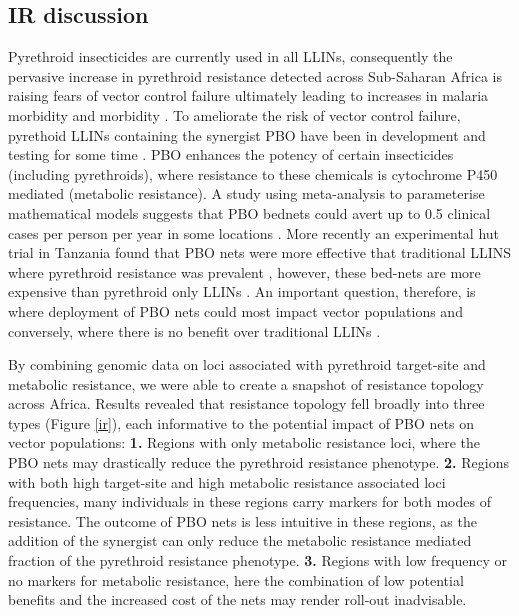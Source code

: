 \documentclass[a4paper,11pt,abstracton,hidelinks]{scrartcl}
\begin{document}
\subsection*{IR discussion}

Pyrethroid insecticides are currently used in all LLINs, consequently the pervasive increase in pyrethroid resistance detected across Sub-Saharan Africa is raising fears of vector control failure ultimately leading to increases in malaria morbidity and morbidity \cite{churcher2016, Hemingway2016}.
%
To ameliorate the risk of vector control failure, pyrethoid LLINs containing the synergist PBO have been in development and testing for some time \cite{darriet2011, protopopoff2018}.
%
PBO enhances the potency of certain insecticides (including pyrethroids), where resistance to these chemicals is cytochrome P450 mediated (metabolic resistance).
%
A study using  meta-analysis to parameterise mathematical models suggests that PBO bednets could avert up to 0.5 clinical cases per person per year in some locations \cite{churcher2016}.
%
More recently an experimental hut trial in Tanzania found that PBO nets were more effective that traditional LLINS where pyrethroid resistance was prevalent \cite{protopopoff2018}, however, these bed-nets are more expensive than pyrethroid only LLINs \cite{churcher2016}.
%
An important question, therefore, is where deployment of PBO nets could most impact vector populations and conversely, where there is no benefit over traditional LLINs \cite{protopopoff2018, toe2018}.

By combining genomic data on loci associated with pyrethroid target-site and metabolic resistance, we were able to create a snapshot of resistance topology across Africa.
%
Results revealed that resistance topology fell broadly into three types (Figure \ref{ir}), each informative to the potential impact of PBO nets on vector populations:
%
\textbf{1.} Regions with only metabolic resistance loci, where the PBO nets may drastically reduce the pyrethroid resistance phenotype.
%
\textbf{2.} Regions with both high target-site and high metabolic resistance associated loci frequencies, many individuals in these regions carry markers for both modes of resistance.
%
The outcome of PBO nets is less intuitive in these regions, as the addition of the synergist can only reduce the metabolic resistance mediated fraction of the pyrethroid resistance phenotype.
%
\textbf{3.} Regions with low frequency or no markers for metabolic resistance, here the combination of low potential benefits and the increased cost of the nets may render roll-out inadvisable.
\end{document}

